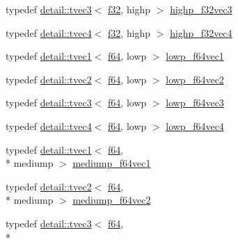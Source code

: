 \begin{DoxyCompactItemize}
\item 
typedef \hyperlink{structglm_1_1detail_1_1tvec3}{detail\-::tvec3}$<$ \hyperlink{group__gtc__type__precision_ga0ec999b57f5330d9021256e96038df04}{f32}, highp $>$ \hyperlink{group__gtc__type__precision_ga581a4a4eb1f3a269d16af0c4e2d8daf4}{highp\-\_\-f32vec3}
\item 
typedef \hyperlink{structglm_1_1detail_1_1tvec4}{detail\-::tvec4}$<$ \hyperlink{group__gtc__type__precision_ga0ec999b57f5330d9021256e96038df04}{f32}, highp $>$ \hyperlink{group__gtc__type__precision_ga53d3c1a17e2e6f26ee5ad1e8879d710e}{highp\-\_\-f32vec4}
\item 
typedef \hyperlink{structglm_1_1detail_1_1tvec1}{detail\-::tvec1}$<$ \hyperlink{group__gtc__type__precision_ga2bba392e555124b36cde6abba349bab3}{f64}, lowp $>$ \hyperlink{group__gtc__type__precision_ga47d9eed23b6e3fc58676176be392293a}{lowp\-\_\-f64vec1}
\item 
typedef \hyperlink{structglm_1_1detail_1_1tvec2}{detail\-::tvec2}$<$ \hyperlink{group__gtc__type__precision_ga2bba392e555124b36cde6abba349bab3}{f64}, lowp $>$ \hyperlink{group__gtc__type__precision_gaf2c6cba98bb2c2f1560d8edff4b70938}{lowp\-\_\-f64vec2}
\item 
typedef \hyperlink{structglm_1_1detail_1_1tvec3}{detail\-::tvec3}$<$ \hyperlink{group__gtc__type__precision_ga2bba392e555124b36cde6abba349bab3}{f64}, lowp $>$ \hyperlink{group__gtc__type__precision_gad2d5e1436d926ae7201c860dce01a0fe}{lowp\-\_\-f64vec3}
\item 
typedef \hyperlink{structglm_1_1detail_1_1tvec4}{detail\-::tvec4}$<$ \hyperlink{group__gtc__type__precision_ga2bba392e555124b36cde6abba349bab3}{f64}, lowp $>$ \hyperlink{group__gtc__type__precision_gaf99497c42a2d011fecab7f3f2312213d}{lowp\-\_\-f64vec4}
\item 
typedef \hyperlink{structglm_1_1detail_1_1tvec1}{detail\-::tvec1}$<$ \hyperlink{group__gtc__type__precision_ga2bba392e555124b36cde6abba349bab3}{f64}, \\*
mediump $>$ \hyperlink{group__gtc__type__precision_ga1e3bbbd9ce5e215c4ba0980264b2711d}{mediump\-\_\-f64vec1}
\item 
typedef \hyperlink{structglm_1_1detail_1_1tvec2}{detail\-::tvec2}$<$ \hyperlink{group__gtc__type__precision_ga2bba392e555124b36cde6abba349bab3}{f64}, \\*
mediump $>$ \hyperlink{group__gtc__type__precision_ga892891863b8e50195e3e48077a329335}{mediump\-\_\-f64vec2}
\item 
typedef \hyperlink{structglm_1_1detail_1_1tvec3}{detail\-::tvec3}$<$ \hyperlink{group__gtc__type__precision_ga2bba392e555124b36cde6abba349bab3}{f64}, \\*

\end{DoxyCompactItemize}
